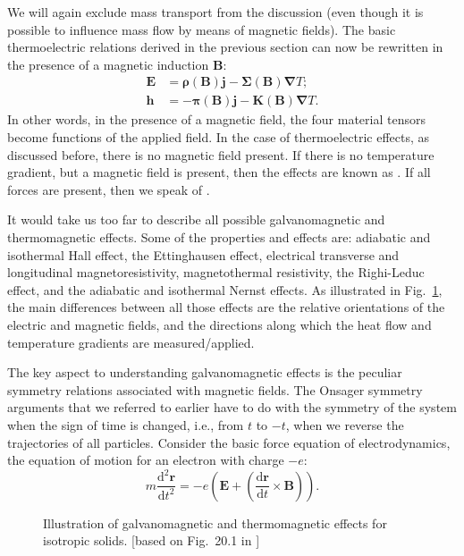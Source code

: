 We will again exclude mass transport from the discussion (even though it is possible to influence mass flow by means of magnetic fields).  The basic thermoelectric relations derived in the previous section can now be rewritten in the presence of a magnetic induction $\mathbf{B}$:
\begin{align}
	\mathbf{E} &= \bm{\rho}(\mathbf{B})\mathbf{j} - \bm{\Sigma}(\mathbf{B})\bm{\nabla} T;\\
	\mathbf{h} &= -\bm{\pi}(\mathbf{B})\mathbf{j} - \bm{K}(\mathbf{B})\bm{\nabla} T.
\end{align}
In other words, in the presence of a magnetic field, the four material tensors become functions of the applied field. In the case of thermoelectric effects, as discussed before, there is no magnetic field present.  If there is no temperature gradient, but a magnetic field is present, then the effects are known as .  If all forces are present, then we speak of .

It would take us too far to describe all possible galvanomagnetic and thermomagnetic effects.  Some of the properties and effects are: adiabatic and isothermal Hall effect, the Ettinghausen effect, electrical transverse and longitudinal magnetoresistivity, magnetothermal resistivity, the Righi-Leduc effect, and the adiabatic and isothermal Nernst effects.  As illustrated in Fig.~\ref{\chabbr:fig:galvanomagnetic}, the main differences between all those effects are the relative orientations of the electric and magnetic fields, and the directions along which the heat flow and temperature gradients are measured/applied.


The key aspect to understanding galvanomagnetic effects is the peculiar symmetry relations associated with magnetic fields.  The Onsager symmetry arguments that we referred to earlier have to do with the symmetry of the system when the sign of time is changed, i.e., from $t$ to $-t$, when we reverse the trajectories of all particles.  Consider the basic force equation of electrodynamics, the equation of motion for an electron with charge $-e$:
\[
	m\frac{\mathrm{d}^2 \mathbf{r}}{\mathrm{d}t^2} = -e\left(\mathbf{E}+(\frac{\mathrm{d}\mathbf{r}}{\mathrm{d}t}
	\times\mathbf{B})\right).
\]

\begin{figure}[t]
\caption{Illustration of galvanomagnetic and thermomagnetic effects for isotropic solids. [based on Fig.\ 20.1 in \protect\cite{newnham2005a}]}
\label{\chabbr:fig:galvanomagnetic}
\end{figure}

